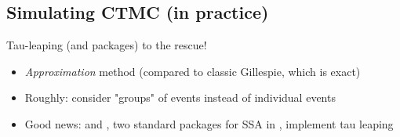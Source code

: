 \documentclass[aspectratio=169]{beamer}
\begin{document}

\subsection{Simulating CTMC (in practice)}

\begin{frame}{Tau-leaping (and packages) to the rescue!}
    \begin{itemize}
        \item \emph{Approximation} method (compared to classic Gillespie, which is exact)
        \item Roughly: consider "groups" of events instead of individual events
        \item Good news:  and , two standard packages for SSA in , implement tau leaping
    \end{itemize}
\end{frame}
\end{document}

